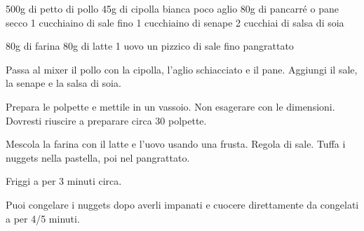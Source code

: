 \begin{ingreds}
	500g di petto di pollo
	45g di cipolla bianca
	poco aglio
	80g di pancarré o pane secco
	1 cucchiaino di sale fino
	1 cucchiaino di senape
	2 cucchiai di salsa di soia

\columnbreak
{}
	80g di farina
	80g di latte
	1 uovo
	un pizzico di sale fino
	pangrattato
\end{ingreds}

\begin{method}
	Passa al mixer il pollo con la cipolla, l'aglio schiacciato e il pane. Aggiungi il sale, la senape e la salsa di soia.

	Prepara le polpette e mettile in un vassoio. Non esagerare con le dimensioni. Dovresti riuscire a preparare circa 30 polpette.

	Mescola la farina con il latte e l'uovo usando una frusta. Regola di sale. Tuffa i nuggets nella pastella, poi nel pangrattato.

	Friggi a  per 3 minuti circa.

\end {method}

	\begin{note}
		Puoi congelare i nuggets dopo averli impanati e cuocere direttamente da congelati a  per 4/5 minuti.
	\end{note}


